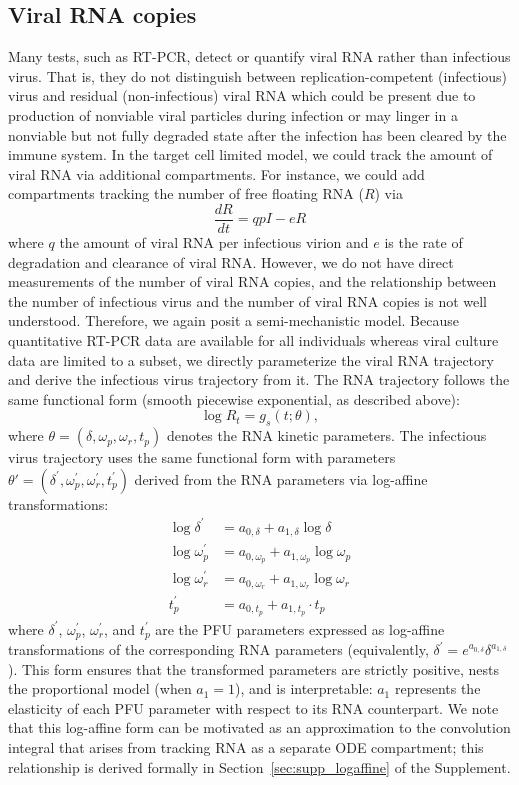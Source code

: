 \documentclass[12pt]{article}
\begin{document}
\subsection{Viral RNA copies}
Many tests, such as RT-PCR, detect or quantify viral RNA rather than infectious virus. That is, they do not distinguish between replication-competent (infectious) virus and residual (non-infectious) viral RNA which could be present due to production of nonviable viral particles during infection or may linger in a nonviable but not fully degraded state after the infection has been cleared by the immune system. In the target cell limited model, we could track the amount of viral RNA via additional compartments. For instance, we could add compartments tracking the number of  free floating RNA ($R$) via 
\begin{equation*}
    \dfrac{dR}{dt} = q p I - e R 
\end{equation*} 
where $q$ the amount of viral RNA per infectious virion and $e$ is the rate of degradation and clearance of viral RNA. However, we do not have direct measurements of the number of viral RNA copies, and the relationship between the number of infectious virus and the number of viral RNA copies is not well understood. Therefore, we again posit a semi-mechanistic model. Because quantitative RT-PCR data are available for all individuals whereas viral culture data are limited to a subset, we directly parameterize the viral RNA trajectory and derive the infectious virus trajectory from it. The RNA trajectory follows the same functional form (smooth piecewise exponential, as described above):
\begin{equation*}
    \log R_t = g_s(t; \theta),
\end{equation*}
where $\theta = (\delta, \omega_p, \omega_r, t_p)$ denotes the RNA kinetic parameters. The infectious virus trajectory uses the same functional form with parameters $\theta' = (\delta^\prime, \omega^\prime_p, \omega^\prime_r, t^\prime_p)$ derived from the RNA parameters via log-affine transformations:
\begin{align*}
    \log \delta^\prime &= a_{0,\delta} + a_{1,\delta} \log \delta \\
    \log \omega^\prime_{p} &= a_{0,\omega_p} + a_{1,\omega_p} \log \omega_{p} \\
    \log \omega^\prime_{r} &= a_{0,\omega_r} + a_{1,\omega_r} \log \omega_{r} \\
    t^\prime_{p} &= a_{0, t_p} + a_{1, t_p} \cdot t_{p} 
\end{align*}
where $\delta^\prime$, $\omega^\prime_{p}$, $\omega^\prime_{r}$, and $t^\prime_{p}$ are the PFU parameters expressed as log-affine transformations of the corresponding RNA parameters (equivalently, $\delta^\prime = e^{a_{0,\delta}} \delta^{a_{1,\delta}}$). This form ensures that the transformed parameters are strictly positive, nests the proportional model (when $a_1 = 1$), and is interpretable: $a_1$ represents the elasticity of each PFU parameter with respect to its RNA counterpart. We note that this log-affine form can be motivated as an approximation to the convolution integral that arises from tracking RNA as a separate ODE compartment; this relationship is derived formally in Section~\ref{sec:supp_logaffine} of the Supplement.
\end{document}
